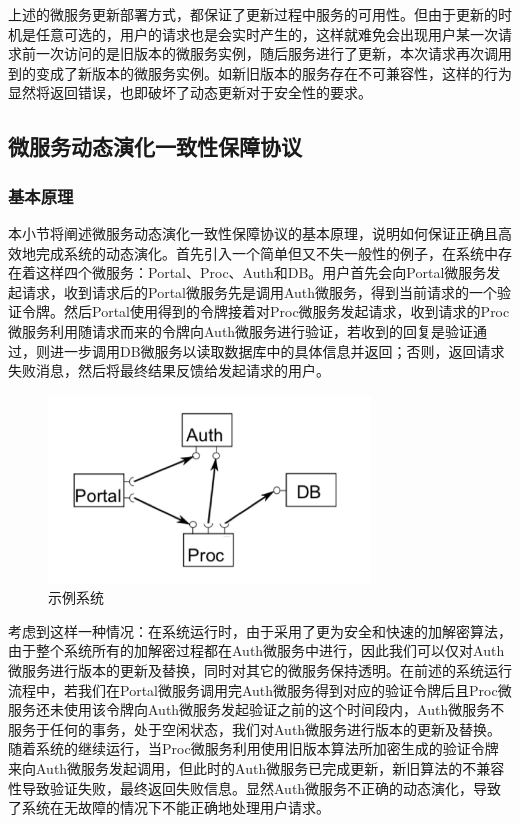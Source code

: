 \documentclass[a4paper, 12pt]{article}
\theoremstyle{definition}
\begin{document}
上述的微服务更新部署方式，都保证了更新过程中服务的可用性。但由于更新的时机是任意可选的，用户的请求也是会实时产生的，这样就难免会出现用户某一次请求前一次访问的是旧版本的微服务实例，随后服务进行了更新，本次请求再次调用到的变成了新版本的微服务实例。如新旧版本的服务存在不可兼容性，这样的行为显然将返回错误，也即破坏了动态更新对于安全性的要求。


\newpage
\subsection{微服务动态演化一致性保障协议}\label{section:version_consistency}

\subsubsection{基本原理}
本小节将阐述微服务动态演化一致性保障协议的基本原理，说明如何保证正确且高效地完成系统的动态演化。首先引入一个简单但又不失一般性的例子，在系统中存在着这样四个微服务：Portal、Proc、Auth和DB。用户首先会向Portal微服务发起请求，收到请求后的Portal微服务先是调用Auth微服务，得到当前请求的一个验证令牌。然后Portal使用得到的令牌接着对Proc微服务发起请求，收到请求的Proc微服务利用随请求而来的令牌向Auth微服务进行验证，若收到的回复是验证通过，则进一步调用DB微服务以读取数据库中的具体信息并返回；否则，返回请求失败消息，然后将最终结果反馈给发起请求的用户。
\begin{figure}[ht]
 \centering
 \includegraphics[height=5cm]{images/Example.png}
 \caption{示例系统}
 \label{fig:Example}
\end{figure}


考虑到这样一种情况：在系统运行时，由于采用了更为安全和快速的加解密算法，由于整个系统所有的加解密过程都在Auth微服务中进行，因此我们可以仅对Auth微服务进行版本的更新及替换，同时对其它的微服务保持透明。在前述的系统运行流程中，若我们在Portal微服务调用完Auth微服务得到对应的验证令牌后且Proc微服务还未使用该令牌向Auth微服务发起验证之前的这个时间段内，Auth微服务不服务于任何的事务，处于空闲状态，我们对Auth微服务进行版本的更新及替换。随着系统的继续运行，当Proc微服务利用使用旧版本算法所加密生成的验证令牌来向Auth微服务发起调用，但此时的Auth微服务已完成更新，新旧算法的不兼容性导致验证失败，最终返回失败信息。显然Auth微服务不正确的动态演化，导致了系统在无故障的情况下不能正确地处理用户请求。
\end{document}
